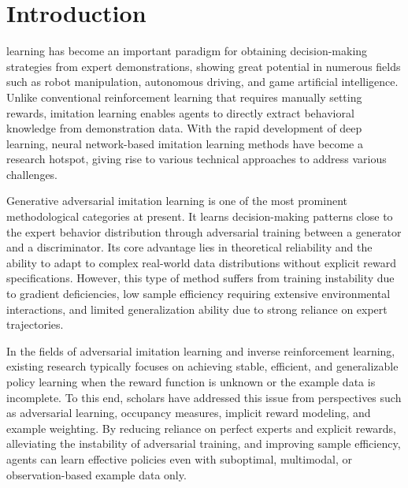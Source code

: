 \documentclass[lettersize,journal]{IEEEtran}
\begin{document}
\section{Introduction}
 learning has become an important paradigm for obtaining decision-making strategies from expert demonstrations, showing great potential in numerous fields such as robot manipulation, autonomous driving, and game artificial intelligence. Unlike conventional reinforcement learning that requires manually setting rewards, imitation learning enables agents to directly extract behavioral knowledge from demonstration data. With the rapid development of deep learning, neural network-based imitation learning methods have become a research hotspot, giving rise to various technical approaches to address various challenges.

Generative adversarial imitation learning is one of the most prominent methodological categories at present. It learns decision-making patterns close to the expert behavior distribution through adversarial training between a generator and a discriminator. Its core advantage lies in theoretical reliability and the ability to adapt to complex real-world data distributions without explicit reward specifications. However, this type of method suffers from training instability due to gradient deficiencies, low sample efficiency requiring extensive environmental interactions, and limited generalization ability due to strong reliance on expert trajectories.

In the fields of adversarial imitation learning and inverse reinforcement learning, existing research typically focuses on achieving stable, efficient, and generalizable policy learning when the reward function is unknown or the example data is incomplete. To this end, scholars have addressed this issue from perspectives such as adversarial learning, occupancy measures, implicit reward modeling, and example weighting. By reducing reliance on perfect experts and explicit rewards, alleviating the instability of adversarial training, and improving sample efficiency, agents can learn effective policies even with suboptimal, multimodal, or observation-based example data only.
\end{document}
